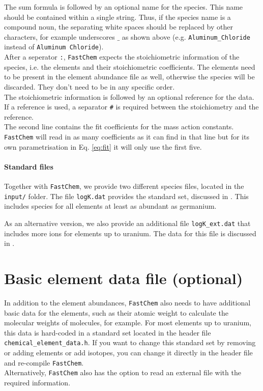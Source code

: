 \documentclass[numbers=noenddot]{aux/fcmanual}
\newcommand{\fc}{\texttt{FastChem}\xspace}
\begin{document}
The sum formula is followed by an optional name for the species. This name should be contained within a single string. Thus, if the species name is a compound noun, the separating white spaces should be replaced by other characters, for example underscores $\_$ as shown above (e.g. \verb|Aluminum_Chloride| instead of \verb|Aluminum Chloride|). \\

After a seperator \verb|:|, \fc expects the stoichiometric information of the species, i.e. the elements and their stoichiometric coefficients. The elements need to be present in the element abundance file as well, otherwise the species will be discarded. They don't need to be in any specific order.\\
The stoichiometric information is followed by an optional reference for the data. If a reference is used, a separator \verb|#| is required between the stoichiometry and the reference.\\

The second line contains the fit coefficients for the mass action constants. \fc will read in as many coefficients as it can find in that line but for its own parametrisation in Eq. \eqref{eq:fit} it will only use the first five.

\paragraph{Standard files}
Together with \fc, we provide two different species files, located in the \verb|input/| folder. The file \verb|logK.dat| provides the standard set, discussed in \citet{Stock2018MNRAS.479..865S}. This includes species for all elements at least as abundant as germanium.

As an alternative version, we also provide an additional file \verb|logK_ext.dat| that includes more ions for elements up to uranium. The data for this file is discussed in \citet{Hoeijmakers2019A&A...627A.165H}.

\newpage
\section{Basic element data file (optional)}
In addition to the element abundances, \fc also needs to have additional basic data for the elements, such as their atomic weight to calculate the molecular weights of molecules, for example. For most elements up to uranium, this data is hard-coded in a standard set located in the header file \verb|chemical_element_data.h|. If you want to change this standard set by removing or adding elements or add isotopes, you can change it directly in the header file and re-compile \fc.\\
Alternatively, \fc also has the option to read an external file with the required information.
\end{document}
